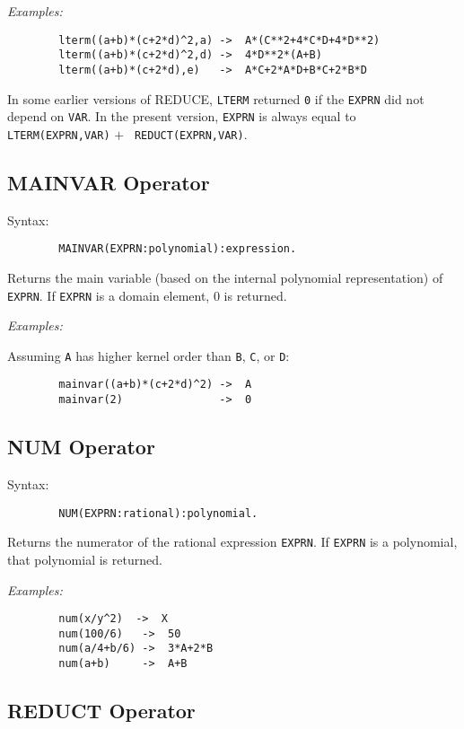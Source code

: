{\it Examples:}
\begin{verbatim}
        lterm((a+b)*(c+2*d)^2,a) ->  A*(C**2+4*C*D+4*D**2)
        lterm((a+b)*(c+2*d)^2,d) ->  4*D**2*(A+B)
        lterm((a+b)*(c+2*d),e)   ->  A*C+2*A*D+B*C+2*B*D
\end{verbatim}

{\COMPATNOTE} In some earlier versions of REDUCE, {\tt LTERM} returned
{\tt 0} if the {\tt EXPRN} did not depend on {\tt VAR}.  In the present
version, {\tt EXPRN} is always equal to {\tt LTERM(EXPRN,VAR)} $+$ {\tt
REDUCT(EXPRN,VAR)}.

\subsection{MAINVAR Operator}
\hypertarget{operator:MAINVAR}{}

Syntax:
\begin{verbatim}
        MAINVAR(EXPRN:polynomial):expression.
\end{verbatim}
Returns the main variable (based on the internal polynomial representation)
of {\tt EXPRN}. If {\tt EXPRN} is a domain element, 0 is returned.

{\it Examples:}

Assuming {\tt A} has higher kernel order than {\tt B}, {\tt C}, or {\tt D}:
\begin{verbatim}
        mainvar((a+b)*(c+2*d)^2) ->  A
        mainvar(2)               ->  0
\end{verbatim}

\subsection{NUM Operator}
\hypertarget{operator:NUM}{}

Syntax:
\begin{verbatim}
        NUM(EXPRN:rational):polynomial.
\end{verbatim}
Returns the numerator of the rational expression {\tt EXPRN}.  If {\tt EXPRN}
is a polynomial, that polynomial is returned.

{\it Examples:}
\begin{verbatim}
        num(x/y^2)  ->  X
        num(100/6)   ->  50
        num(a/4+b/6) ->  3*A+2*B
        num(a+b)     ->  A+B
\end{verbatim}

\subsection{REDUCT Operator}
\hypertarget{operator:REDUCT}{}

